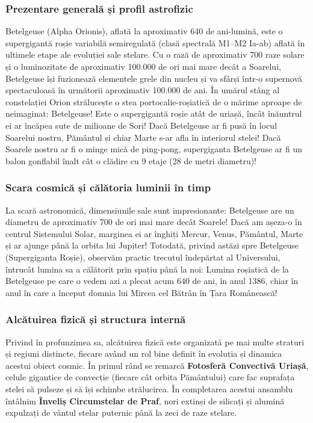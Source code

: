 \subsubsection*{Prezentare generală și profil astrofizic}
Betelgeuse (Alpha Orionis), aflată la aproximativ 640 de ani-lumină, este o supergigantă roșie variabilă semiregulată (clasă spectrală M1--M2 Ia-ab) aflată în ultimele etape ale evoluției sale stelare. Cu o rază de aproximativ 700 raze solare și o luminozitate de aproximativ 100.000 de ori mai mare decât a Soarelui, Betelgeuse își fuzionează elementele grele din nucleu și va sfârși într-o supernovă spectaculoasă în următorii aproximativ 100.000 de ani. În umărul stâng al constelației Orion strălucește o stea portocalie-roșiatică de o mărime aproape de neimaginat: Betelgeuse! Este o supergigantă roșie atât de uriașă, încât înăuntrul ei ar încăpea sute de milioane de Sori! Dacă Betelgeuse ar fi pusă în locul Soarelui nostru, Pământul și chiar Marte s-ar afla în interiorul stelei! Dacă Soarele nostru ar fi o minge mică de ping-pong, supergiganta Betelgeuse ar fi un balon gonflabil înalt cât o clădire cu 9 etaje (28 de metri diametru)!

\subsubsection*{Scara cosmică și călătoria luminii în timp}
La scară astronomică, dimensiunile sale sunt impresionante: Betelgeuse are un diametru de aproximativ 700 de ori mai mare decât Soarele! Dacă am așeza-o în centrul Sistemului Solar, marginea ei ar înghiți Mercur, Venus, Pământul, Marte și ar ajunge până la orbita lui Jupiter! Totodată, privind astăzi spre Betelgeuse (Supergiganta Roșie), observăm practic trecutul îndepărtat al Universului, întrucât lumina sa a călătorit prin spațiu până la noi: Lumina roșiatică de la Betelgeuse pe care o vedem azi a plecat acum 640 de ani, în anul 1386, chiar în anul în care a început domnia lui Mircea cel Bătrân în Țara Românească!

\subsubsection*{Alcătuirea fizică și structura internă}
Privind în profunzimea sa, alcătuirea fizică este organizată pe mai multe straturi și regiuni distincte, fiecare având un rol bine definit în evoluția și dinamica acestui obiect cosmic. În primul rând se remarcă \textbf{Fotosferă Convectivă Uriașă}, celule gigantice de convecție (fiecare cât orbita Pământului) care fac suprafața stelei să pulseze și să își schimbe strălucirea. În completarea acestui ansamblu întâlnim \textbf{Înveliș Circumstelar de Praf}, nori extinși de silicați și alumină expulzați de vântul stelar puternic până la zeci de raze stelare.

